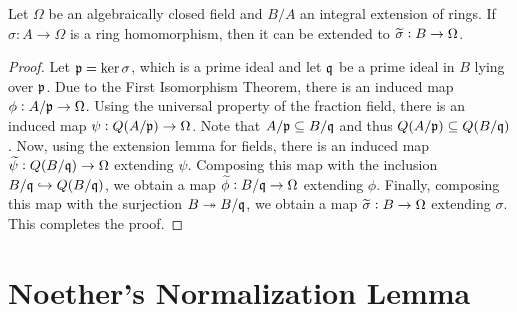 \begin{theorem}
    Let $\Omega$ be an algebraically closed field and $B/A$ an integral extension of rings. If $\sigma: A\to\Omega$ is a ring homomorphism, then it can be extended to $\widetilde{\sigma}: B\to\Omega$.
\end{theorem}
\begin{proof}
    Let $\mathfrak p = \ker\sigma$, which is a prime ideal and let $\mathfrak q$ be a prime ideal in $B$ lying over $\mathfrak p$. Due to the First Isomorphism Theorem, there is an induced map $\phi: A/\mathfrak p\to\Omega$. Using the universal property of the fraction field, there is an induced map $\psi: Q(A/\mathfrak p)\to\Omega$. Note that $A/\mathfrak p\subseteq B/\mathfrak q$ and thus $Q(A/\mathfrak p)\subseteq Q(B/\mathfrak q)$. Now, using the extension lemma for fields, there is an induced map $\widetilde{\psi}: Q(B/\mathfrak q)\to\Omega$ extending $\psi$. Composing this map with the inclusion $B/\mathfrak q\hookrightarrow Q(B/\mathfrak q)$, we obtain a map $\widetilde{\phi}: B/\mathfrak q\to\Omega$ extending $\phi$. Finally, composing this map with the surjection $B\twoheadrightarrow B/\mathfrak q$, we obtain a map $\widetilde{\sigma}: B\to\Omega$ extending $\sigma$. This completes the proof.
\end{proof}

\section{Noether's Normalization Lemma}

